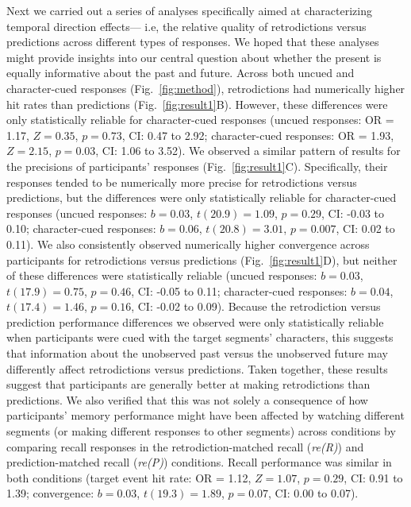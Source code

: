 \documentclass[10pt]{article}
\begin{document}
Next we carried out a series of analyses specifically aimed at characterizing temporal direction effects--- i.e, the relative quality of retrodictions versus predictions across different types of responses.  We hoped that these analyses might provide insights into our central question about whether the present is equally informative about the past and future.  Across both uncued and character-cued responses (Fig.~\ref{fig:method}), retrodictions had numerically higher hit rates than predictions (Fig.~\ref{fig:result1}B).  However, these differences were only statistically reliable for character-cued responses (uncued responses: OR = 1.17, $Z = 0.35$, $p = 0.73$, CI: 0.47 to 2.92; character-cued responses: OR = 1.93, $Z = 2.15$, $p = 0.03$, CI: 1.06 to 3.52).  We observed a similar pattern of results for the precisions of participants' responses (Fig.~\ref{fig:result1}C).  Specifically, their responses tended to be numerically more precise for retrodictions versus predictions, but the differences were only statistically reliable for character-cued responses (uncued responses: $b = 0.03$, $t(20.9) = 1.09$, $p = 0.29$, CI: -0.03 to 0.10; character-cued responses: $b = 0.06$, $t(20.8) = 3.01$, $p = 0.007$, CI: 0.02 to 0.11).  We also consistently observed numerically higher convergence across participants for retrodictions versus predictions (Fig.~\ref{fig:result1}D), but neither of these differences were statistically reliable (uncued responses: $b = 0.03$, $t(17.9) = 0.75$, $p = 0.46$, CI: -0.05 to 0.11; character-cued responses: $b = 0.04$, $t(17.4) = 1.46$, $p = 0.16$, CI: -0.02 to 0.09).  Because the retrodiction versus prediction performance differences we observed were only statistically reliable when participants were cued with the target segments' characters, this suggests that information about the unobserved past versus the unobserved future may differently affect retrodictions versus predictions.  Taken together, these results suggest that participants are generally better at making retrodictions than predictions.  We also verified that this was not solely a consequence of how participants' memory performance might have been affected by watching different segments (or making different responses to other segments) across conditions by comparing recall responses in the retrodiction-matched recall (\textit{re(R)}) and prediction-matched recall (\textit{re(P)}) conditions.  Recall performance was similar in both conditions (target event hit rate: OR = 1.12, $Z = 1.07$, $p = 0.29$, CI: 0.91 to 1.39; convergence: $b = 0.03$, $t(19.3) = 1.89$, $p = 0.07$, CI: 0.00 to 0.07).
\end{document}
